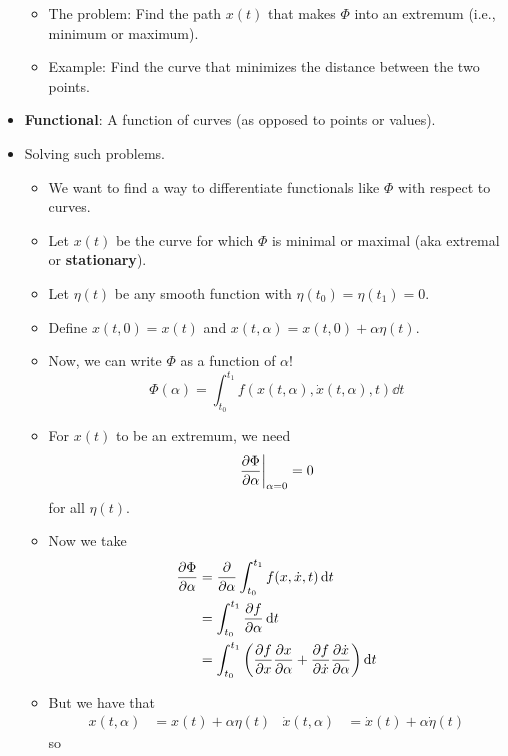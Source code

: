 \documentclass[../notes.tex]{subfiles}
\begin{document}
\begin{itemize}
\begin{itemize}
        \item The problem: Find the path $x(t)$ that makes $\Phi$ into an extremum (i.e., minimum or maximum).
        \item Example: Find the curve that minimizes the distance between the two points.
    \end{itemize}
    \item \textbf{Functional}: A function of curves (as opposed to points or values).
    \item Solving such problems.
    \begin{itemize}
        \item We want to find a way to differentiate functionals like $\Phi$ with respect to curves.
        \item Let $x(t)$ be the curve for which $\Phi$ is minimal or maximal (aka extremal or \textbf{stationary}).
        \item Let $\eta(t)$ be any smooth function with $\eta(t_0)=\eta(t_1)=0$.
        \item Define $x(t,0)=x(t)$ and $x(t,\alpha)=x(t,0)+\alpha\eta(t)$.
        \item Now, we can write $\Phi$ as a function of $\alpha$!
        \begin{equation*}
            \Phi(\alpha) = \int_{t_0}^{t_1}f(x(t,\alpha),\dot{x}(t,\alpha),t)\dd{t}
        \end{equation*}
        \item For $x(t)$ to be an extremum, we need
        \begin{equation*}
            \eval{\pdv{\Phi}{\alpha}}_{\alpha=0} = 0
        \end{equation*}
        for all $\eta(t)$.
        \item Now we take
        \begin{align*}
            \pdv{\Phi}{\alpha} &= \pdv{\alpha}\int_{t_0}^{t_1}f(x,\dot{x},t)\dd{t}\\
            &= \int_{t_0}^{t_1}\pdv{f}{\alpha}(x,\dot{x},t)\dd{t}\\
            &= \int_{t_0}^{t_1}\left( \pdv{f}{x}\pdv{x}{\alpha}+\pdv{f}{\dot{x}}\pdv{\dot{x}}{\alpha} \right)\dd{t}
        \end{align*}
        \item But we have that
        \begin{align*}
            x(t,\alpha) &= x(t)+\alpha\eta(t)&
            \dot{x}(t,\alpha) &= \dot{x}(t)+\alpha\dot{\eta}(t)
        \end{align*}
        so

\end{itemize}
\end{itemize}
\end{document}
